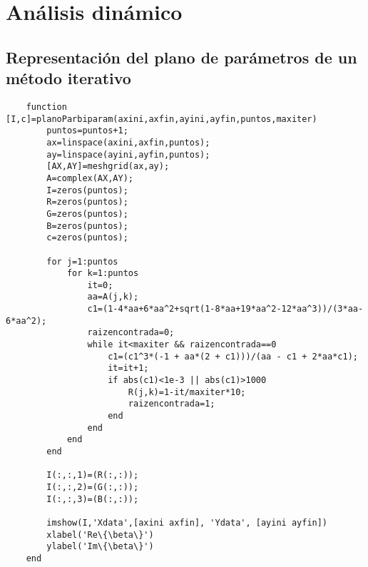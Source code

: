 

\appendix

\chapter{Análisis dinámico}

\section{Representación del plano de parámetros de un método iterativo}
\begin{lstlisting}
	function [I,c]=planoParbiparam(axini,axfin,ayini,ayfin,puntos,maxiter)
		puntos=puntos+1;
		ax=linspace(axini,axfin,puntos);
		ay=linspace(ayini,ayfin,puntos);
		[AX,AY]=meshgrid(ax,ay);
		A=complex(AX,AY);
		I=zeros(puntos);
		R=zeros(puntos);
		G=zeros(puntos);
		B=zeros(puntos);
		c=zeros(puntos);
		
		for j=1:puntos
			for k=1:puntos
				it=0;
				aa=A(j,k);
				c1=(1-4*aa+6*aa^2+sqrt(1-8*aa+19*aa^2-12*aa^3))/(3*aa-6*aa^2);
				raizencontrada=0;
				while it<maxiter && raizencontrada==0
					c1=(c1^3*(-1 + aa*(2 + c1)))/(aa - c1 + 2*aa*c1);
					it=it+1;
					if abs(c1)<1e-3 || abs(c1)>1000
						R(j,k)=1-it/maxiter*10;
						raizencontrada=1;
					end
				end
			end
		end
		
		I(:,:,1)=(R(:,:));
		I(:,:,2)=(G(:,:));
		I(:,:,3)=(B(:,:));
		
		imshow(I,'Xdata',[axini axfin], 'Ydata', [ayini ayfin])
		xlabel('Re\{\beta\}')
		ylabel('Im\{\beta\}')
	end
\end{lstlisting}

